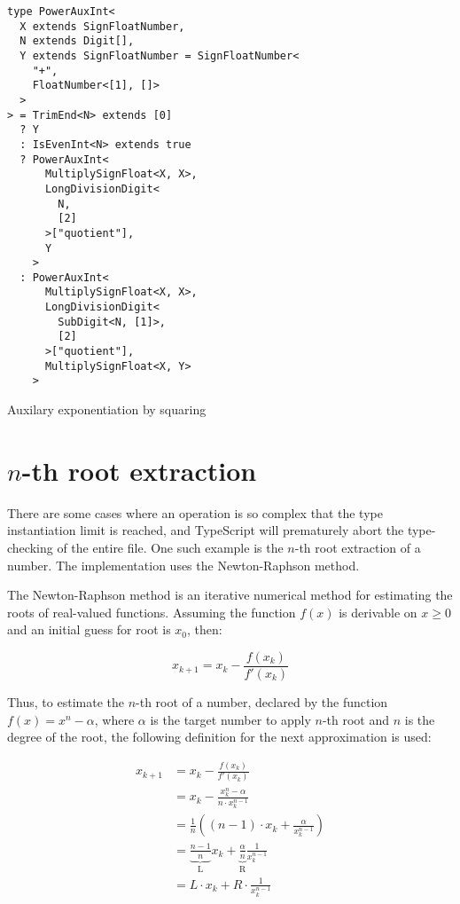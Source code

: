 \begin{listing}[ht]
  \begin{verbatim}
type PowerAuxInt<
  X extends SignFloatNumber,
  N extends Digit[],
  Y extends SignFloatNumber = SignFloatNumber<
    "+", 
    FloatNumber<[1], []>
  >
> = TrimEnd<N> extends [0]
  ? Y
  : IsEvenInt<N> extends true
  ? PowerAuxInt<
      MultiplySignFloat<X, X>,
      LongDivisionDigit<
        N, 
        [2]
      >["quotient"],
      Y
    >
  : PowerAuxInt<
      MultiplySignFloat<X, X>,
      LongDivisionDigit<
        SubDigit<N, [1]>, 
        [2]
      >["quotient"],
      MultiplySignFloat<X, Y>
    >
\end{verbatim}
  \caption{Auxilary exponentiation by squaring}\label{lst:exponentiation-by-squaring-ts}
\end{listing}

\section{$n$-th root extraction}\label{sec:root-extraction}

There are some cases where an operation is so complex that the type instantiation limit is reached, and TypeScript will prematurely abort the type-checking of the entire file. One such example is the $n$-th root extraction of a number. The implementation uses the Newton-Raphson method.

The Newton-Raphson method \cite{gerlachAcceleratedConvergenceNewton1994} is an iterative numerical method for estimating the roots of real-valued functions. Assuming the function $f(x)$ is derivable on $x \ge 0$ and an initial guess for root is $x_0$, then:

\begin{equation}
  x_{k+1} = x_k - \frac{f(x_k)}{f'(x_k)}
\end{equation}

\clearpage

Thus, to estimate the $n$-th root of a number, declared by the function $f(x) = x^n - \alpha$, where $\alpha$ is the target number to apply $n$-th root and $n$ is the degree of the root, the following definition for the next approximation is used:

\begin{equation}
  \begin{split}
    x_{k+1} & = x_k - \frac{f(x_k)}{f'(x_k)}                                                                         \\
            & = x_k - \frac{x_k^n - \alpha}{n \cdot x_k^{n-1}}                                                       \\
            & = \frac{1}{n} \left( (n-1) \cdot x_k + \frac{\alpha}{x_k^{n-1}} \right)                                \\
            & = \underbrace{\frac{n-1}{n}}_\text{L} x_k + \underbrace{\frac{\alpha}{n}}_\text{R} \frac{1}{x_k^{n-1}} \\
            & = L \cdot x_k + R \cdot \frac{1}{x_k^{n-1}}                                                            \\
  \end{split}
\end{equation}

